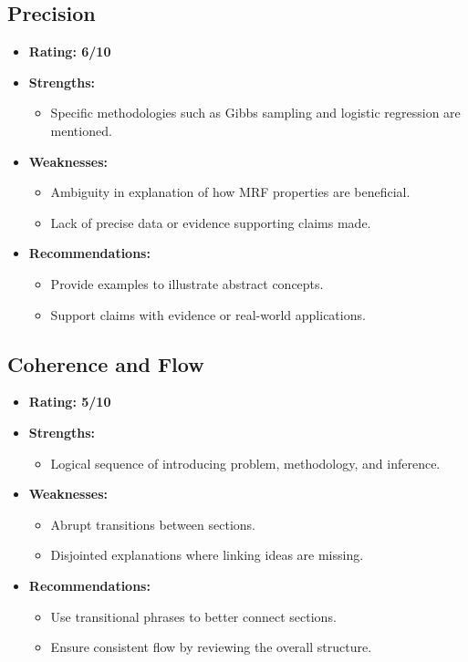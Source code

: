 \documentclass{article}
\begin{document}
\subsection{Precision}
\begin{itemize}
    \item \textbf{Rating: 6/10}
    \item \textbf{Strengths:}
    \begin{itemize}
        \item Specific methodologies such as Gibbs sampling and logistic regression are mentioned.
    \end{itemize}
    \item \textbf{Weaknesses:}
    \begin{itemize}
        \item Ambiguity in explanation of how MRF properties are beneficial.
        \item Lack of precise data or evidence supporting claims made.
    \end{itemize}
    \item \textbf{Recommendations:}
    \begin{itemize}
        \item Provide examples to illustrate abstract concepts.
        \item Support claims with evidence or real-world applications.
    \end{itemize}
\end{itemize}

\subsection{Coherence and Flow}
\begin{itemize}
    \item \textbf{Rating: 5/10}
    \item \textbf{Strengths:}
    \begin{itemize}
        \item Logical sequence of introducing problem, methodology, and inference.
    \end{itemize}
    \item \textbf{Weaknesses:}
    \begin{itemize}
        \item Abrupt transitions between sections.
        \item Disjointed explanations where linking ideas are missing.
    \end{itemize}
    \item \textbf{Recommendations:}
    \begin{itemize}
        \item Use transitional phrases to better connect sections.
        \item Ensure consistent flow by reviewing the overall structure.
    \end{itemize}
\end{itemize}
\end{document}
